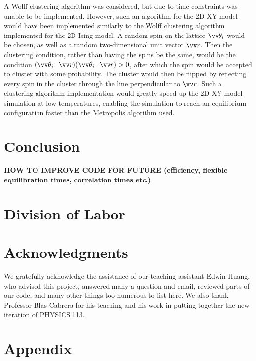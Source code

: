 \documentclass[twocolumn,aps,prl]{revtex4-1} %
\begin{document}
A Wolff clustering algorithm was considered, but due to time constraints was unable to be implemented. However, such an algorithm for the 2D XY model would have been implemented similarly to the Wolff clustering algorithm implemented for the 2D Ising model. A random spin on the lattice $\vv \theta_i$ would be chosen, as well as a random two-dimensional unit vector $\vv r$. Then the clustering condition, rather than having the spins be the same, would be the condition $(\vv \theta_i \cdot \vv r) (\vv \theta_i \cdot \vv r) > 0$, after which the spin would be accepted to cluster with some probability. The cluster would then be flipped by reflecting every spin in the cluster through the line perpendicular to $\vv r$. Such a clustering algorithm implementation would greatly speed up the 2D XY model simulation at low temperatures, enabling the simulation to reach an equilibrium configuration faster than the Metropolis algorithm used. 

\section{Conclusion}
\textbf{HOW TO IMPROVE CODE FOR FUTURE (efficiency, flexible equilibration times, correlation times etc.)}

\section{Division of Labor}


\section{Acknowledgments}
We gratefully acknowledge the assistance of our teaching assistant Edwin Huang, who advised this project, answered many a question and email, reviewed parts of our code, and many other things too numerous to list here. We also thank Professor Blas Cabrera for his teaching and his work in putting together the new iteration of PHYSICS 113.


\section{Appendix}
\end{document}
